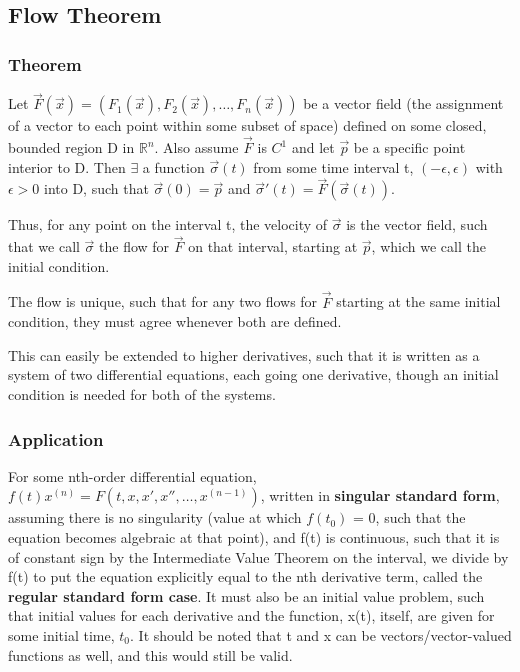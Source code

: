 \documentclass[11 pt, twoside]{article}
\newcommand{\realn}{\mathbb{R}^n}
\begin{document}
\subsection{Flow Theorem}
\subsubsection{Theorem} 
Let $\vec{F}(\vec{x}) = (F_1(\vec{x}), F_2(\vec{x}), \dots, F_n(\vec{x}))$ be a vector field (the assignment of a vector to each point within some subset of space) defined on some closed, bounded region D in $\realn$. Also assume $\vec{F}$ is $C^1$ and let $\vec{p}$ be a specific point interior to D. Then $\exists$ a function $\vec{\sigma}(t)$ from some time interval t, $(-\epsilon, \epsilon)$ with $\epsilon > 0$ into D, such that $\vec{\sigma}(0) = \vec{p}$ and $\vec{\sigma}'(t) = \vec{F}(\vec{\sigma}(t)).$

Thus, for any point on the interval t, the velocity of $\vec{\sigma}$ is the vector field, such that we call $\vec{\sigma}$ the flow for $\vec{F}$ on that interval, starting at $\vec{p}$, which we call the initial condition.

The flow is unique, such that for any two flows for $\vec{F}$ starting at the same initial condition, they must agree whenever both are defined.

This can easily be extended to higher derivatives, such that it is written as a system of two differential equations, each going one derivative, though an initial condition is needed for both of the systems.

\subsubsection{Application}
For some nth-order differential equation, $f(t)x^{(n)} = F(t, x, x', x'', \dots, x^{(n-1)})$, written in \textbf{singular standard form}, assuming there is no singularity (value at which $f(t_0)$ = 0, such that the equation becomes algebraic at that point), and f(t) is continuous, such that it is of constant sign by the Intermediate Value Theorem on the interval, we divide by f(t) to put the equation explicitly equal to the nth derivative term, called the \textbf{regular standard form case}. It must also be an initial value problem, such that initial values for each derivative and the function, x(t), itself, are given for some initial time, $t_0$. It should be noted that t and x can be vectors/vector-valued functions as well, and this would still be valid.
\end{document}
